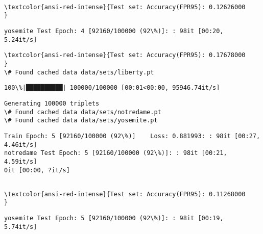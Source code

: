 \documentclass[11pt]{article}
\begin{document}
    \begin{Verbatim}[commandchars=\\\{\}]

\textcolor{ansi-red-intense}{Test set: Accuracy(FPR95): 0.12626000
}

    \end{Verbatim}

    \begin{Verbatim}[commandchars=\\\{\}]
yosemite Test Epoch: 4 [92160/100000 (92\%)]: : 98it [00:20,  5.24it/s]

    \end{Verbatim}

    \begin{Verbatim}[commandchars=\\\{\}]
\textcolor{ansi-red-intense}{Test set: Accuracy(FPR95): 0.17678000
}
\# Found cached data data/sets/liberty.pt

    \end{Verbatim}

    \begin{Verbatim}[commandchars=\\\{\}]
100\%|██████████| 100000/100000 [00:01<00:00, 95946.74it/s]

    \end{Verbatim}

    \begin{Verbatim}[commandchars=\\\{\}]
Generating 100000 triplets
\# Found cached data data/sets/notredame.pt
\# Found cached data data/sets/yosemite.pt
    \end{Verbatim}

    \begin{Verbatim}[commandchars=\\\{\}]
Train Epoch: 5 [92160/100000 (92\%)]	Loss: 0.881993: : 98it [00:27,  4.46it/s]
notredame Test Epoch: 5 [92160/100000 (92\%)]: : 98it [00:21,  4.59it/s]
0it [00:00, ?it/s]
    \end{Verbatim}

    \begin{Verbatim}[commandchars=\\\{\}]

\textcolor{ansi-red-intense}{Test set: Accuracy(FPR95): 0.11268000
}

    \end{Verbatim}

    \begin{Verbatim}[commandchars=\\\{\}]
yosemite Test Epoch: 5 [92160/100000 (92\%)]: : 98it [00:19,  5.74it/s]

    \end{Verbatim}
\end{document}
